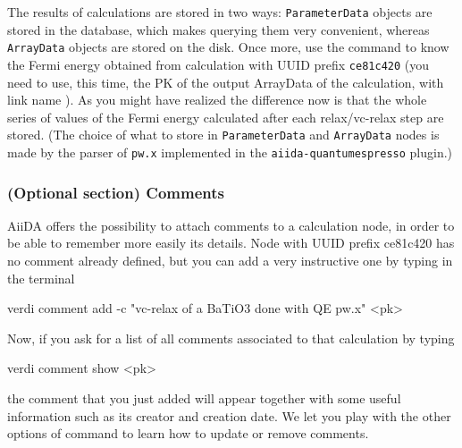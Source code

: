 The results of calculations are stored in two ways: \texttt{ParameterData} objects are stored in the database, which makes querying them very convenient, whereas \texttt{ArrayData} objects are stored on the disk. Once more, use the command  to know the Fermi energy obtained from calculation with UUID prefix \texttt{ce81c420} (you need to use, this time, the PK of the output ArrayData of the calculation, with link name ). As you might have realized the difference now is that the whole series of values of the Fermi energy calculated after each relax/vc-relax step are stored. (The choice of what to store in \texttt{ParameterData} and \texttt{ArrayData} nodes is made by the parser of \texttt{pw.x} implemented in the \texttt{aiida-quantumespresso} plugin.)

\subsubsection*{(Optional section) Comments}
AiiDA offers the possibility to attach comments to a calculation node, in order to be able to remember more easily its details. Node with UUID prefix ce81c420 has no comment already defined, but you can add a very instructive one by typing in the terminal
\begin{bashcommand}
verdi comment add -c "vc-relax of a BaTiO3 done with QE pw.x" <pk>
\end{bashcommand}
Now, if you ask for a list of all comments associated to that calculation by typing
\begin{bashcommand}
verdi comment show <pk>
\end{bashcommand}
the comment that you just added will appear together with some useful information such as its creator and creation date. We let you play with the other options of  command to learn how to update or remove comments.




